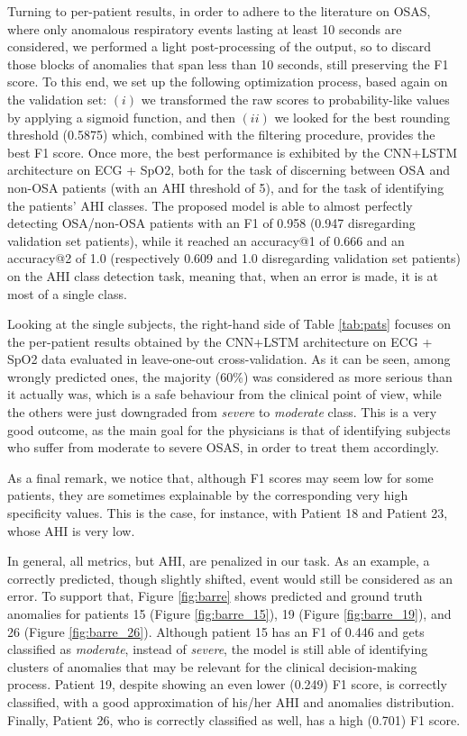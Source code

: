 \documentclass[5p,twocolumn,lefttitle]{elsarticle}
\begin{document}
Turning to per-patient results, in order to adhere to the literature on OSAS, where only anomalous respiratory events lasting at least 10 seconds are considered, we performed a light post-processing of the output, so to discard those blocks of anomalies that span less than 10 seconds, still preserving the F1 score. To this end, we set up the following optimization process,  based again on the validation set: $(i)$ we transformed the raw scores to probability-like values by applying a sigmoid function, and then $(ii)$ we looked for the best rounding threshold (0.5875) which, combined with the filtering procedure, provides the best F1 score. Once more, the best performance is exhibited by the CNN+LSTM architecture on ECG + SpO2, both for the task of discerning between OSA and non-OSA patients (with an AHI threshold of 5), and for the task of identifying the patients' AHI classes. The proposed model is able to almost perfectly detecting OSA/non-OSA patients with an F1 of 0.958 (0.947 disregarding validation set patients), while it reached an accuracy@1 of 0.666 and an accuracy@2 of 1.0 (respectively 0.609 and 1.0 disregarding validation set patients) on the AHI class detection task, meaning that, when an error is made, it is at most of a single class. 

Looking at the single subjects, the right-hand side of Table \ref{tab:pats} focuses on the per-patient results obtained by the CNN+LSTM architecture on ECG + SpO2 data evaluated in leave-one-out cross-validation. As it can be seen, among wrongly predicted ones, the majority (60\%) was considered as more serious than it actually was, which is a safe behaviour from the clinical point of view, while the others were just downgraded from \emph{severe} to \emph{moderate} class. This is a very good outcome, as the main goal for the physicians is that of identifying subjects who suffer from moderate to severe OSAS, in order to treat them accordingly.

As a final remark, we notice that, although F1 scores may seem low for some patients, they are sometimes explainable by the corresponding very high specificity values. This is the case, for instance, with Patient 18 and Patient 23, whose AHI is very low. 

In general, all metrics, but AHI, are penalized in our task. As an example, a correctly predicted, though slightly shifted, event would still be considered as an error. To support that, Figure \ref{fig:barre} shows predicted and ground truth anomalies for patients 15 (Figure \ref{fig:barre_15}), 19 (Figure \ref{fig:barre_19}), and 26 (Figure \ref{fig:barre_26}). Although patient 15 has an F1 of 0.446 and gets classified as \emph{moderate}, instead of \emph{severe}, the model is still able of identifying clusters of anomalies that may be relevant for the clinical decision-making process. Patient 19, despite showing an even lower (0.249) F1 score, is correctly classified, with a good approximation of his/her AHI and anomalies distribution. Finally, Patient 26, who is correctly classified as well, has a high (0.701) F1 score.
\end{document}
